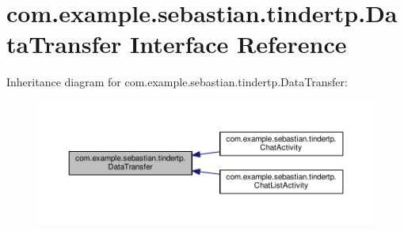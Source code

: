 \hypertarget{interfacecom_1_1example_1_1sebastian_1_1tindertp_1_1DataTransfer}{}\section{com.\+example.\+sebastian.\+tindertp.\+Data\+Transfer Interface Reference}
\label{interfacecom_1_1example_1_1sebastian_1_1tindertp_1_1DataTransfer}


Inheritance diagram for com.\+example.\+sebastian.\+tindertp.\+Data\+Transfer\+:\nopagebreak
\begin{figure}[H]
\begin{center}
\leavevmode
\includegraphics[width=350pt]{interfacecom_1_1example_1_1sebastian_1_1tindertp_1_1DataTransfer__inherit__graph}
\end{center}
\end{figure}
